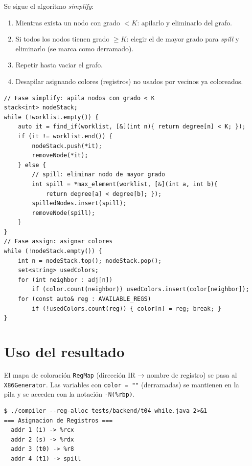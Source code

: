 Se sigue el algoritmo \emph{simplify}:

\begin{enumerate}
  \item Mientras exista un nodo con grado $< K$: apilarlo y eliminarlo del grafo.
  \item Si todos los nodos tienen grado $\geq K$: elegir el de mayor grado para
    \emph{spill} y eliminarlo (se marca como derramado).
  \item Repetir hasta vaciar el grafo.
  \item Desapilar asignando colores (registros) no usados por vecinos ya coloreados.
\end{enumerate}

\begin{lstlisting}[style=cpp, caption={Coloración simplificada de Chaitin-Briggs}]
// Fase simplify: apila nodos con grado < K
stack<int> nodeStack;
while (!worklist.empty()) {
    auto it = find_if(worklist, [&](int n){ return degree[n] < K; });
    if (it != worklist.end()) {
        nodeStack.push(*it);
        removeNode(*it);
    } else {
        // spill: eliminar nodo de mayor grado
        int spill = *max_element(worklist, [&](int a, int b){
            return degree[a] < degree[b]; });
        spilledNodes.insert(spill);
        removeNode(spill);
    }
}
// Fase assign: asignar colores
while (!nodeStack.empty()) {
    int n = nodeStack.top(); nodeStack.pop();
    set<string> usedColors;
    for (int neighbor : adj[n])
        if (color.count(neighbor)) usedColors.insert(color[neighbor]);
    for (const auto& reg : AVAILABLE_REGS)
        if (!usedColors.count(reg)) { color[n] = reg; break; }
}
\end{lstlisting}

\section{Uso del resultado}

El mapa de coloración \texttt{RegMap} (dirección IR → nombre de registro)
se pasa al \texttt{X86Generator}. Las variables con \texttt{color = ""}
(derramadas) se mantienen en la pila y se acceden con la notación
\texttt{-N(\%rbp)}.

\begin{verbatim}
$ ./compiler --reg-alloc tests/backend/t04_while.java 2>&1
=== Asignacion de Registros ===
  addr 1 (i) -> %rcx
  addr 2 (s) -> %rdx
  addr 3 (t0) -> %r8
  addr 4 (t1) -> spill
\end{verbatim}
